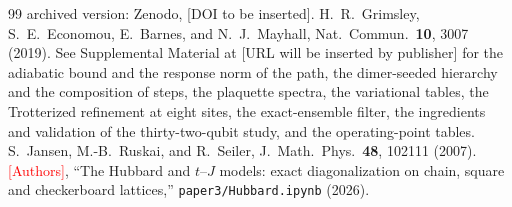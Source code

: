 \documentclass[a4paper,11pt,noarxiv]{quantumarticle}
\newcommand{\todo}[1]{\textcolor{red}{[#1]}}
\begin{document}
\begin{thebibliography}{99}
archived version: Zenodo, [DOI to be inserted].
 H.~R.~Grimsley, S.~E.~Economou, E.~Barnes, and
N.~J.~Mayhall, Nat.\ Commun.\ \textbf{10}, 3007 (2019).
 See Supplemental Material at [URL will be inserted by
publisher] for the adiabatic bound and the response norm of the path, the
dimer-seeded hierarchy and the composition of steps, the plaquette spectra,
the variational tables, the Trotterized refinement at eight sites, the
exact-ensemble filter, the ingredients and validation of the thirty-two-qubit
study, and the operating-point tables.
 S.~Jansen, M.-B.~Ruskai, and R.~Seiler, J.~Math.\ Phys.\
\textbf{48}, 102111 (2007).
 \todo{Authors}, ``The Hubbard and $t$--$J$ models:
exact diagonalization on chain, square and checkerboard lattices,''
\texttt{paper3/Hubbard.ipynb} (2026).
\end{thebibliography}
\end{document}

